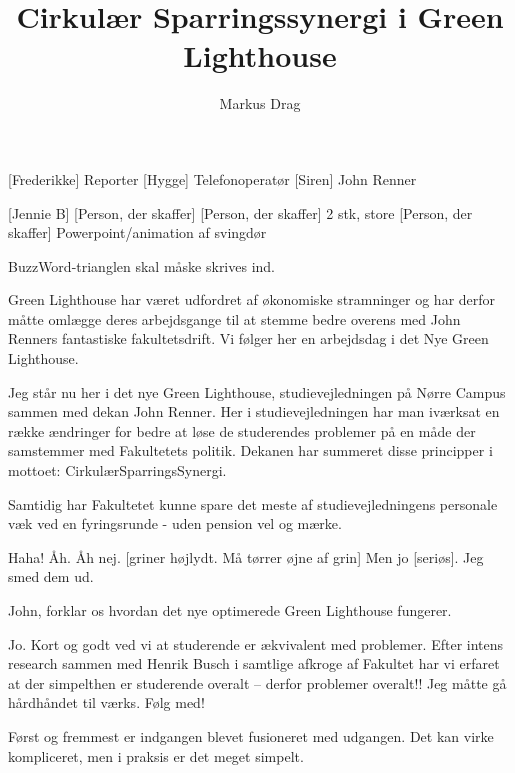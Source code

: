 \documentclass[a4paper,11pt]{article}
\title{Cirkulær Sparringssynergi i Green Lighthouse}
\author{Markus Drag}
\begin{document}
\maketitle

\begin{roles}
    [Frederikke] Reporter
    [Hygge] Telefonoperatør
    [Siren] John Renner
\end{roles}

\begin{props}
    [Jennie B] 
    [Person, der skaffer]
    [Person, der skaffer] 2 stk, store 
    [Person, der skaffer] Powerpoint/animation af svingdør
\end{props}


\begin{sketch}

BuzzWord-trianglen skal måske skrives ind.

\scene Green Lighthouse har været udfordret af økonomiske stramninger og har derfor måtte omlægge deres arbejdsgange til at stemme bedre overens med John Renners fantastiske fakultetsdrift. Vi følger her en arbejdsdag i det Nye Green Lighthouse.

 Jeg står nu her i det nye Green Lighthouse, studievejledningen på Nørre Campus sammen med dekan John Renner. Her i studievejledningen har man iværksat en række ændringer for bedre at løse de studerendes problemer på en måde der samstemmer med Fakultetets politik. Dekanen har summeret disse principper i mottoet: CirkulærSparringsSynergi.


 Samtidig har Fakultetet kunne spare det meste af studievejledningens personale væk ved en fyringsrunde - uden pension vel og mærke.

 Haha! Åh. Åh nej. [griner højlydt. Må tørrer øjne af grin] Men jo [seriøs]. Jeg smed dem ud.

 John, forklar os hvordan det nye optimerede Green Lighthouse fungerer.

 Jo. Kort og godt ved vi at studerende er ækvivalent med problemer. Efter intens research sammen med Henrik Busch i samtlige afkroge af Fakultet har vi erfaret at der simpelthen er studerende overalt – derfor problemer overalt!! Jeg måtte gå hårdhåndet til værks. Følg med!


 Først og fremmest er indgangen blevet fusioneret med udgangen. Det kan virke kompliceret, men i praksis er det meget simpelt.


\end{sketch}
\end{document}
